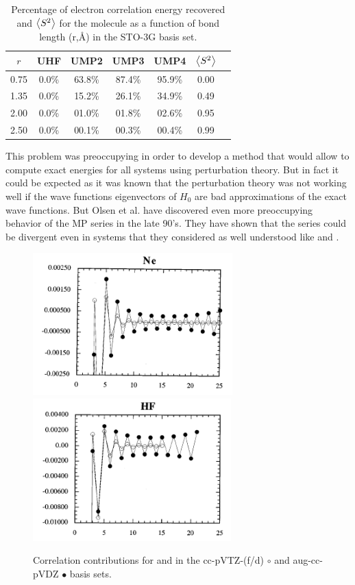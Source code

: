 \documentclass[11pt,a4paper]{article}
\begin{document}
\begin{table}[h!]
    \centering
    \begin{tabular}{c c c c c c c}
\hline
 $r$ & UHF & UMP2 & UMP3 & UMP4 & $\expval{S^2}$ \\
\hline
0.75 & 0.0\% & 63.8\% & 87.4\% & 95.9\% & 0.00\\
1.35 & 0.0\% & 15.2\% & 26.1\% & 34.9\% & 0.49\\
2.00 & 0.0\% & 01.0\% & 01.8\% & 02.6\% & 0.95\\
2.50 & 0.0\% & 00.1\% & 00.3\% & 00.4\% & 0.99\\
\hline
\end{tabular}
    \caption{\centering Percentage of electron correlation energy recovered and $\expval{S^2}$ for the  molecule as a function of bond length (r,\si{\angstrom}) in the STO-3G basis set.}
    \label{tab:my_label}
\end{table}

This problem was preoccupying in order to develop a method that would allow to compute exact energies for all systems using perturbation theory. But in fact it could be expected as it was known that the perturbation theory was not working well if the wave functions eigenvectors of $H_0$ are bad approximations of the exact wave functions. But Olsen et al. have discovered even more preoccupying behavior of the MP series in the late 90's. They have shown that the series could be divergent even in systems that they considered as well understood like  and . 

\begin{figure}[h!]
    \includegraphics[height=5.5cm]{Nedivergence.png}
    \hfill
    \includegraphics[height=5.5cm]{HFdivergence.png}
    \hfill
    \caption{\centering Correlation contributions for  and  in the cc-pVTZ-(f/d) $\circ$ and aug-cc-pVDZ $\bullet$ basis sets.}
    \label{fig:my_label}
\end{figure}
 
\end{document}
